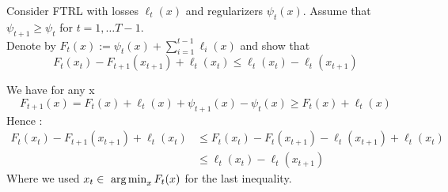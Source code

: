\begin{exercise}[]{}
	Consider FTRL with losses $ \ell_t(x) $ and regularizers $ \psi_t(x) $. Assume that $ \psi_{t+1} \geq \psi_t $ for $ t=1, \ldots T-1 $.\\
	Denote by $ F_t(x) := \psi_t(x) + \sum_{i=1}^{t-1}\ell_i(x) $ and show that
\begin{equation*}
	F_t(x_t) - F_{t+1}(x_{t+1}) + \ell_t(x_t) \leq  \ell_t(x_t) - \ell_t(x_{t+1})
\end{equation*}

\end{exercise}

\begin{solution}[]
We have for any x 
\begin{equation*}
	F_{t+1}(x) = F_t(x) + \ell_t(x) + \psi_{t+1}(x) - \psi_t(x) \geq F_t(x) + \ell_t(x)
\end{equation*}
Hence :
\begin{align*}
	F_t(x_t) - F_{t+1}(x_{t+1}) +\ell_t(x_t) &\leq F_t(x_t) - F_t(x_{t+1}) -\ell_t(x_{t+1}) + \ell_t(x_t) \\
						 &\leq \ell_t(x_t) - \ell_t(x_{t+1})
\end{align*}
Where we used $ x_t \in \mathop{\mbox{ arg\,min}}_x F_t(x) $ for the last inequality.
\end{solution}
